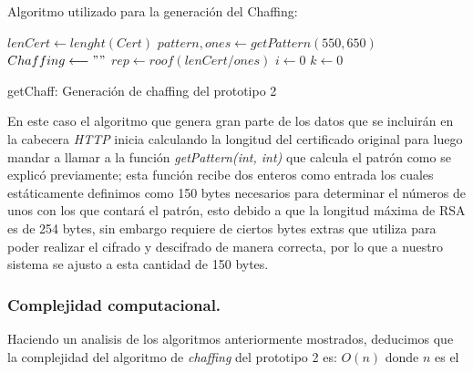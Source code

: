 \documentclass[12pt, a4paper, titlepage]{report}
\begin{document}
                Algoritmo utilizado para la generación del Chaffing:\\
                \begin{algorithm}[H]
                    \SetAlgoLined
                    $lenCert \longleftarrow lenght(Cert)$\;
                    $pattern,ones \longleftarrow getPattern(550, 650)$\;
                    $Chaffing \longleftarrow " "$\;
                    $rep \longleftarrow roof(lenCert/ones)$\;
                    $i \longleftarrow 0$\;
                    $k \longleftarrow 0$\;
                    \caption{getChaff: Generación de chaffing del prototipo 2}
                \end{algorithm}
                En este caso el algoritmo que genera gran parte de los datos que se incluirán en la cabecera \textit{HTTP} inicia calculando la longitud del certificado original para luego mandar a llamar a la función \textit{getPattern(int, int)} que calcula el patrón como se explicó previamente; esta función recibe dos enteros como entrada los cuales estáticamente definimos como 150 bytes necesarios para determinar el números de unos con los que contará el patrón, esto debido a que la longitud máxima de RSA es de 254 bytes, sin embargo requiere de ciertos bytes extras que utiliza para poder realizar el cifrado y descifrado de manera correcta, por lo que a nuestro sistema se ajusto a esta cantidad de 150 bytes.
                
                \subsubsection{Complejidad computacional.}
                    Haciendo un analisis de los algoritmos anteriormente mostrados, deducimos que la complejidad del algoritmo de \textit{chaffing} del prototipo 2 es:
                    $O(n)$ donde $n$ es el
                
\end{document}
